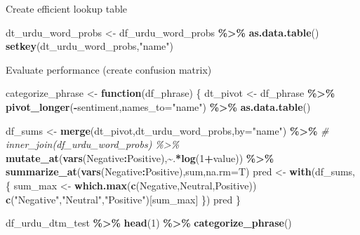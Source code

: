 \documentclass[
]{article}
\newenvironment{Shaded}{\begin{snugshade}}{\end{snugshade}}
\newcommand{\CommentTok}[1]{\textcolor[rgb]{0.56,0.35,0.01}{\textit{#1}}}
\newcommand{\ControlFlowTok}[1]{\textcolor[rgb]{0.13,0.29,0.53}{\textbf{#1}}}
\newcommand{\DataTypeTok}[1]{\textcolor[rgb]{0.13,0.29,0.53}{#1}}
\newcommand{\DecValTok}[1]{\textcolor[rgb]{0.00,0.00,0.81}{#1}}
\newcommand{\KeywordTok}[1]{\textcolor[rgb]{0.13,0.29,0.53}{\textbf{#1}}}
\newcommand{\NormalTok}[1]{#1}
\newcommand{\OperatorTok}[1]{\textcolor[rgb]{0.81,0.36,0.00}{\textbf{#1}}}
\newcommand{\StringTok}[1]{\textcolor[rgb]{0.31,0.60,0.02}{#1}}
\begin{document}
Create efficient lookup table

\begin{Shaded}
\begin{Highlighting}[]
\NormalTok{dt\_urdu\_word\_probs \textless{}{-}}\StringTok{ }\NormalTok{df\_urdu\_word\_probs }\OperatorTok{\%\textgreater{}\%}\StringTok{ }\KeywordTok{as.data.table}\NormalTok{()}
\KeywordTok{setkey}\NormalTok{(dt\_urdu\_word\_probs,}\StringTok{"name"}\NormalTok{)}
\end{Highlighting}
\end{Shaded}

Evaluate performance (create confusion matrix)

\begin{Shaded}
\begin{Highlighting}[]
\NormalTok{categorize\_phrase \textless{}{-}}\StringTok{ }\ControlFlowTok{function}\NormalTok{(df\_phrase) \{}
\NormalTok{  dt\_pivot \textless{}{-}}\StringTok{ }\NormalTok{df\_phrase }\OperatorTok{\%\textgreater{}\%}
\StringTok{    }\KeywordTok{pivot\_longer}\NormalTok{(}\OperatorTok{{-}}\NormalTok{sentiment,}\DataTypeTok{names\_to=}\StringTok{"name"}\NormalTok{) }\OperatorTok{\%\textgreater{}\%}
\StringTok{    }\KeywordTok{as.data.table}\NormalTok{()}
    
\NormalTok{  df\_sums \textless{}{-}}\StringTok{ }\KeywordTok{merge}\NormalTok{(dt\_pivot,dt\_urdu\_word\_probs,}\DataTypeTok{by=}\StringTok{"name"}\NormalTok{) }\OperatorTok{\%\textgreater{}\%}
\StringTok{    }\CommentTok{\# inner\_join(df\_urdu\_word\_probs) \%\textgreater{}\%}
\StringTok{    }\KeywordTok{mutate\_at}\NormalTok{(}\KeywordTok{vars}\NormalTok{(Negative}\OperatorTok{:}\NormalTok{Positive),}\OperatorTok{\textasciitilde{}}\NormalTok{.}\OperatorTok{*}\KeywordTok{log}\NormalTok{(}\DecValTok{1}\OperatorTok{+}\NormalTok{value)) }\OperatorTok{\%\textgreater{}\%}
\StringTok{    }\KeywordTok{summarize\_at}\NormalTok{(}\KeywordTok{vars}\NormalTok{(Negative}\OperatorTok{:}\NormalTok{Positive),sum,}\DataTypeTok{na.rm=}\NormalTok{T)}
\NormalTok{    pred \textless{}{-}}\StringTok{ }\KeywordTok{with}\NormalTok{(df\_sums,}
\NormalTok{                 \{ sum\_max \textless{}{-}}\StringTok{ }\KeywordTok{which.max}\NormalTok{(}\KeywordTok{c}\NormalTok{(Negative,Neutral,Positive))}
                 \KeywordTok{c}\NormalTok{(}\StringTok{"Negative"}\NormalTok{,}\StringTok{"Neutral"}\NormalTok{,}\StringTok{"Positive"}\NormalTok{)[sum\_max] \})}
\NormalTok{    pred}
\NormalTok{\}}

\NormalTok{df\_urdu\_dtm\_test }\OperatorTok{\%\textgreater{}\%}\StringTok{ }\KeywordTok{head}\NormalTok{(}\DecValTok{1}\NormalTok{) }\OperatorTok{\%\textgreater{}\%}\StringTok{ }\KeywordTok{categorize\_phrase}\NormalTok{()}
\end{Highlighting}
\end{Shaded}
\end{document}
